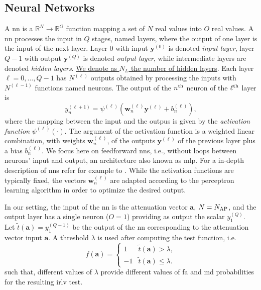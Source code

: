 \documentclass[draftcls,onecolumn,12pt]{IEEEtran}
\begin{document}
\subsection{Neural Networks}\label{sec:nn}

A \ac{nn} is a $\mathbb{R}^N \to \mathbb{R}^O$ function mapping a set of $N$ real values into $O$ real values. A \ac{nn} processes the input in $Q$ stages, named layers, where the output of one layer is the input of the next layer. Layer $0$ with input $\bm{y}^{(0)}$ is denoted {\em input layer}, layer $Q-1$ with output $\bm{y}^{(Q)}$ is denoted {\em output layer}, while intermediate layers are denoted {\em hidden layers}. \underline{We denote as $N_L$ the number of hidden layers}.
%
Each layer $\ell=0, \ldots, Q-1$ has $N^{(\ell)}$ outputs obtained by processing the inputs with $N^{(\ell-1)}$ functions named neurons. The output of the $n^{\rm th}$ neuron of the $\ell^{\rm th}$ layer is
\begin{equation}\label{eq:nonLin}
y_n^{(\ell+1)} = \psi^{(\ell)}\left( \bm{w}_n^{(\ell)}\bm{y}^{(\ell)}+b_n^{(\ell)} \right),
\end{equation}
where the mapping between the input and the outpus is given by the {\em activation function} $\psi^{(\ell)}(\cdot)$. The argument of the activation function is a weighted linear combination, with weights $\bm{w}_n^{(\ell)}$, of the outputs $\bm{y}^{(\ell)}$ of the previous layer plus a bias $b_n^{(\ell)}$. We focus here on feedforward \acp{nn}, i.e., without loops between neurons' input and output, an architecture also known as \ac{mlp}. For a in-depth description of \acp{nn} refer for example to \underline{\cite[Chapter 6]{goodfellow}}. While the activation functions are typically fixed, the vectors $\bm{w}_n^{(\ell)}$ are adapted according to the perceptron learning algorithm in order to optimize the desired output. 

In our setting, the input of the \ac{nn} is the attenuation vector $\bm{a}$, $N=N_{\rm AP}$, and the output layer has a single neuron ($O=1$) providing as output the scalar $y^{(Q)}_1$. Let $\tilde{t}(\bm{a}) = y^{(Q-1)}_1$ be the output of the \ac{nn} corresponding to the attenuation vector input $\bm{a}$. A threshold $\lambda$ is used after computing the test function, i.e.
\begin{equation}
\label{testfunNN}
    f(\bm{a}) = \begin{cases}
    1 & \tilde{t}(\bm{a}) > \lambda, \\
    -1 & \tilde{t}(\bm{a}) \leq \lambda.
    \end{cases}
\end{equation}
such that, different values of $\lambda$ provide different values of \ac{fa} and \ac{md} probabilities for the resulting \ac{irlv} test.
\end{document}
